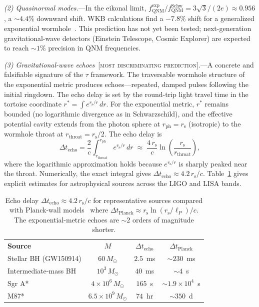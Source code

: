 \documentclass[prl,twocolumn,superscriptaddress,longbibliography,floatfix]{revtex4-2}
\newcommand{\tauasym}{\tau}
\newcommand{\rs}{r_{\mathrm{s}}}
\begin{document}
\emph{(2) Quasinormal modes.}---In the eikonal limit,
$f_{\text{QNM}}^{\text{exp}}/
f_{\text{QNM}}^{\text{Schw}}
= 3\sqrt{3}/(2e) \approx 0.956$,
a $\sim 4.4\%$ downward shift.
WKB calculations find a $-7.8\%$ shift for a generalized
exponential wormhole~\cite{NathSarma2025}.
This prediction has not yet been tested; next-generation
gravitational-wave detectors
(Einstein Telescope, Cosmic Explorer) are expected to reach
$\sim 1\%$ precision in QNM frequencies.

\emph{(3) Gravitational-wave echoes}~[\textsc{most
discriminating prediction}].---A concrete and
falsifiable signature of the $\tauasym$ framework.
The traversable wormhole structure of the exponential
metric produces echoes---repeated, damped pulses following
the initial ringdown.
The echo delay is set by the round-trip light travel time
in the tortoise coordinate $r^* = \int e^{\rs/r}\,dr$.
For the exponential metric, $r^*$ remains bounded
(no logarithmic divergence as in Schwarzschild), and
the effective potential cavity extends from the photon
sphere at $r_{\mathrm{ph}} = \rs$ (isotropic) to the
wormhole throat at $r_{\mathrm{throat}} = \rs/2$.
The echo delay is
\begin{equation}
  \Delta t_{\text{echo}}
  = \frac{2}{c}\!\int_{r_{\mathrm{throat}}}^{r_{\mathrm{ph}}}
  \!\!e^{\rs/r}\,dr
  \;\approx\; \frac{4\,\rs}{c}
  \ln\!\left(\frac{\rs}{r_{\mathrm{throat}}}\right),
  \label{eq:echo}
\end{equation}
where the logarithmic approximation holds because
$e^{\rs/r}$ is sharply peaked near the throat.
Numerically, the exact integral gives
$\Delta t_{\text{echo}} \approx 4.2\,\rs/c$.
Table~\ref{tab:echo} gives explicit estimates for
astrophysical sources across the LIGO and LISA bands.

\begin{table}[t]
\caption{\label{tab:echo}%
Echo delay $\Delta t_{\text{echo}} \approx 4.2\,\rs/c$
for representative sources compared with Planck-wall
models~\cite{Cardoso2016} where
$\Delta t_{\text{Planck}} \approx \rs\ln(\rs/\ell_P)/c$.
The exponential-metric echoes are $\sim 2$ orders of
magnitude shorter.}
\begin{ruledtabular}
\begin{tabular}{lccc}
  \textbf{Source} & $M$ & $\Delta t_{\text{echo}}$
    & $\Delta t_{\text{Planck}}$ \\
  \colrule
  Stellar BH (GW150914) & $60\,M_\odot$
    & $2.5$~ms & $\sim 230$~ms \\
  Intermediate-mass BH & $10^{3}\,M_\odot$
    & $40$~ms & $\sim 4$~s \\
  Sgr A* & $4{\times}10^{6}\,M_\odot$
    & $165$~s & $\sim 1.9{\times}10^{4}$~s \\
  M87* & $6.5{\times}10^{9}\,M_\odot$
    & $74$~hr & $\sim 350$~d \\
\end{tabular}
\end{ruledtabular}
\end{table}
\end{document}
